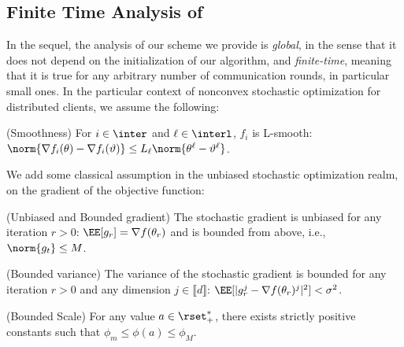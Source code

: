 \documentclass{article}
\begin{document}
\subsection{Finite Time Analysis of \algo}
In the sequel, the analysis of our scheme we provide is \emph{global}, in the sense that it does not depend on the initialization of our algorithm, and \emph{finite-time}, meaning that it is true for any arbitrary number of communication rounds, in particular small ones.
In the particular context of nonconvex stochastic optimization for distributed clients, we assume the following:

\begin{assumption}\label{ass:smooth}(Smoothness)
For $i \in \inter$ and $\ell \in \interl$, $f_i$ is  L-smooth: $\norm{\nabla f_i (\theta) - \nabla f_i (\vartheta)} \leq L_\ell \norm{\theta^\ell-\vartheta^\ell}$.
\end{assumption}
We add some classical assumption in the unbiased stochastic optimization realm, on the gradient of the objective function:
\begin{assumption}\label{ass:boundgrad}(Unbiased and Bounded gradient)
The stochastic gradient is unbiased for any iteration $r>0$: $\EE[g_r] = \nabla f(\theta_r)$ and is bounded from above, i.e., $\norm{g_t} \leq M$.
\end{assumption}

\begin{assumption}\label{ass:var}(Bounded variance)
The variance of the stochastic gradient is bounded for any iteration $r>0$ and any dimension $j \in \llbracket d \rrbracket$: $\EE[|g_r^j - \nabla f(\theta_r)^j|^2] < \sigma^2$.
\end{assumption}

\begin{assumption}\label{ass:phi}(Bounded Scale)
For any value $a \in \rset^*_+$, there exists strictly positive constants such that $\phi_m \leq  \phi(a) \leq \phi_M$.
\end{assumption}
\end{document}
